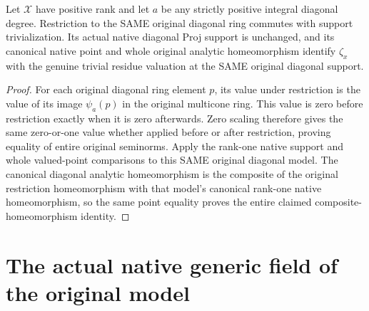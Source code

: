 \begin{theorem}
\label{thm:seven-diagonal-native-support-trivial}
\leanok
Let $\mathcal X$ have positive rank and let $a$ be any strictly positive
integral diagonal degree. Restriction to the SAME original diagonal ring
commutes with support trivialization. Its actual native diagonal Proj
support is unchanged, and its canonical native point and whole original
analytic homeomorphism identify $\zeta_x$ with the genuine trivial residue
valuation at the SAME original diagonal support.
\end{theorem}
\begin{proof}
For each original diagonal ring element $p$, its value under restriction
is the value of its image $\psi_a(p)$ in the original multicone ring.
This value is zero before restriction exactly when it is zero afterwards.
Zero scaling therefore gives the same zero-or-one value whether applied
before or after restriction, proving equality of entire original seminorms.
Apply the rank-one native support and whole valued-point comparisons to
this SAME original diagonal model. The canonical diagonal analytic
homeomorphism is the composite of the original restriction homeomorphism
with that model's canonical rank-one native homeomorphism, so the same
point equality proves the entire claimed composite-homeomorphism identity.
\end{proof}

\section{The actual native generic field of the original model}


